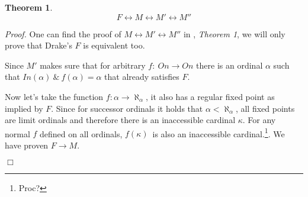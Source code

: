 \documentclass[12pt,a4paper]{article}
\newtheorem{theorem}{Theorem}[section]
\newenvironment{proof}
{\noindent \textit{Proof.}}
{\hspace*{\fill} $\Box$}
\renewcommand{\iff}{\leftrightarrow}
\newcommand{\then}{\rightarrow}
\begin{document}
\begin{theorem}
\begin{equation}
F \iff M \iff M' \iff M''
\end{equation}
\end{theorem}

\begin{proof}
One can find the proof of $M \iff M' \iff M''$ in \cite{Levy60a}, \emph{Theorem 1}, we will only prove that Drake's $F$ is equivalent too.

Since $M'$ makes sure that for arbitrary $f :\ On \then On$ there is an ordinal $\alpha$ such that $In(\alpha)\ \&\ f(\alpha) = \alpha$ that already satisfies $F$.


Now let's take the function $f: \alpha \then \aleph_\alpha$, it also has a regular fixed point as implied by $F$. Since for successor ordinals it holds that $\alpha < \aleph_\alpha$, all fixed points are limit ordinals and therefore there is an inaccessible cardinal $\kappa$. For any normal $f$ defined on all ordinals, $f(\kappa)$ is also an inaccessible cardinal.\footnote{Proc?}. We have proven $F \then M$.

\end{proof}
\end{document}
